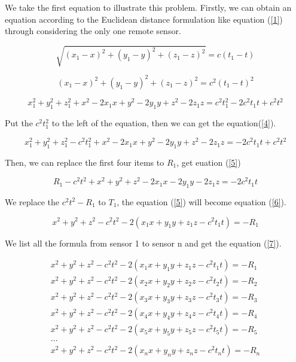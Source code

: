\documentclass[runningheads,a4paper]{llncs}
\begin{document}
	We take the first equation to illustrate this problem. Firstly, we can obtain an equation according to the Euclidean distance formulation like equation (\ref{1}) through considering the only one remote sensor.
	
	\begin{equation}
	\label{1}
	\sqrt{(x_1-x)^2+(y_1-y)^2+(z_1-z)^2}=c(t_1-t)	
	\end{equation}
	
	\begin{equation}
	{(x_1-x)^2+(y_1-y)^2+(z_1-z)^2}=c^2(t_1-t)^2	
	\end{equation}
	
	\begin{equation}
	x_1^2+y_1^2+z_1^2+x^2-2x_1x+y^2-2y_1y+z^2-2z_1z=c^2t_1^2-2c^2t_1t+c^2t^2	
	\end{equation}
	
	Put the $c^2t_1^2$ to the left of the equation, then we can get the equation(\ref{4}).
	
	\begin{equation}
	\label{4}
		x_1^2+y_1^2+z_1^2-c^2t_1^2+x^2-2x_1x+y^2-2y_1y+z^2-2z_1z=-2c^2t_1t+c^2t^2
	\end{equation}
	
	Then, we can replace the first four items to $R_1$, get euation (\ref{5})
	
	\begin{equation}
	\label{5}
	R_1-c^2t^2+x^2+y^2+z^2-2x_1x-2y_1y-2z_1z=-2c^2t_1t
	\end{equation}
	
	We replace the $c^2t^2-R_1$ to $T_1$, the equation (\ref{5}) will become equation (\ref{6}).
	
	\begin{equation}
	\label{6}
	x^2+y^2+z^2-c^2t^2-2(x_1x+y_1y+z_1z-c^2t_1t)=-R_1
	\end{equation}
	
	We list all the formula from sensor 1 to sensor n and get the equation (\ref{7}).
	
	\begin{equation}
	\begin{split}
	\label{7}
	x^2+y^2+z^2-c^2t^2-2(x_1x+y_1y+z_1z-c^2t_1t)=-R_1\\
	x^2+y^2+z^2-c^2t^2-2(x_2x+y_2y+z_2z-c^2t_2t)=-R_2\\
	x^2+y^2+z^2-c^2t^2-2(x_3x+y_3y+z_3z-c^2t_3t)=-R_3\\
	x^2+y^2+z^2-c^2t^2-2(x_4x+y_4y+z_4z-c^2t_4t)=-R_4\\
	x^2+y^2+z^2-c^2t^2-2(x_5x+y_5y+z_5z-c^2t_5t)=-R_5\\
	\dots\\
	x^2+y^2+z^2-c^2t^2-2(x_nx+y_ny+z_nz-c^2t_nt)=-R_n
	\end{split}
	\end{equation}
	
\end{document}

